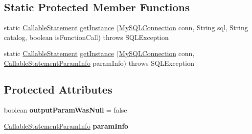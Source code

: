 \subsection*{Static Protected Member Functions}
\begin{DoxyCompactItemize}
\item 
static \mbox{\hyperlink{classcom_1_1mysql_1_1jdbc_1_1_callable_statement}{Callable\+Statement}} \mbox{\hyperlink{classcom_1_1mysql_1_1jdbc_1_1_callable_statement_a48501c01025bf2330e0dc26b7e43947e}{get\+Instance}} (\mbox{\hyperlink{interfacecom_1_1mysql_1_1jdbc_1_1_my_s_q_l_connection}{My\+S\+Q\+L\+Connection}} conn, String sql, String catalog, boolean is\+Function\+Call)  throws S\+Q\+L\+Exception 
\item 
static \mbox{\hyperlink{classcom_1_1mysql_1_1jdbc_1_1_callable_statement}{Callable\+Statement}} \mbox{\hyperlink{classcom_1_1mysql_1_1jdbc_1_1_callable_statement_a1333dd5bd813e16fd179c31927c46c83}{get\+Instance}} (\mbox{\hyperlink{interfacecom_1_1mysql_1_1jdbc_1_1_my_s_q_l_connection}{My\+S\+Q\+L\+Connection}} conn, \mbox{\hyperlink{classcom_1_1mysql_1_1jdbc_1_1_callable_statement_1_1_callable_statement_param_info}{Callable\+Statement\+Param\+Info}} param\+Info)  throws S\+Q\+L\+Exception 
\end{DoxyCompactItemize}
\subsection*{Protected Attributes}
\begin{DoxyCompactItemize}
\item 
\mbox{\label{classcom_1_1mysql_1_1jdbc_1_1_callable_statement_a7cedad387fd6f10dafed9f99039d25ea}} 
boolean {\bfseries output\+Param\+Was\+Null} = false
\item 
\mbox{\label{classcom_1_1mysql_1_1jdbc_1_1_callable_statement_a03bf34bcfaa9a4c0e6b64cb746d4250b}} 
\mbox{\hyperlink{classcom_1_1mysql_1_1jdbc_1_1_callable_statement_1_1_callable_statement_param_info}{Callable\+Statement\+Param\+Info}} {\bfseries param\+Info}
\end{DoxyCompactItemize}
